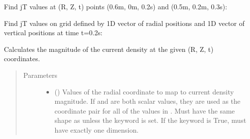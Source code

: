 \documentclass[letterpaper,10pt,english]{sphinxmanual}
\begin{document}
\begin{fulllineitems}
\begin{fulllineitems}
Find jT values at (R, Z, t) points (0.6m, 0m, 0.2s) and
(0.5m, 0.2m, 0.3s):

\begin{sphinxVerbatim}[commandchars=\\\{\}]
  \PYG{p}{[} \PYG{p}{]} \PYG{p}{[} \PYG{p}{]} \PYG{p}{[} \PYG{p}{]} 
\end{sphinxVerbatim}

Find jT values on grid defined by 1D vector of radial positions 
and 1D vector of vertical positions  at time t=0.2s:

\begin{sphinxVerbatim}[commandchars=\\\{\}]
     
\end{sphinxVerbatim}

\end{fulllineitems}


\begin{fulllineitems}
\label{\detokenize{eqtools:eqtools.core.Equilibrium.rz2j}}
Calculates the magnitude of the current density at the given (R, Z, t) coordinates.
\begin{quote}\begin{description}
\item[{Parameters}] \leavevmode\begin{itemize}
\item {} 
 () \textendash{} Values of the radial coordinate to
map to current density magnitude. If  and  are both scalar
values, they are used as the coordinate pair for all of the
values in . Must have the same shape as  unless the
 keyword is set. If the  keyword is True,
 must have exactly one dimension.


\end{itemize}
\end{description}
\end{quote}
\end{fulllineitems}
\end{fulllineitems}
\end{document}
